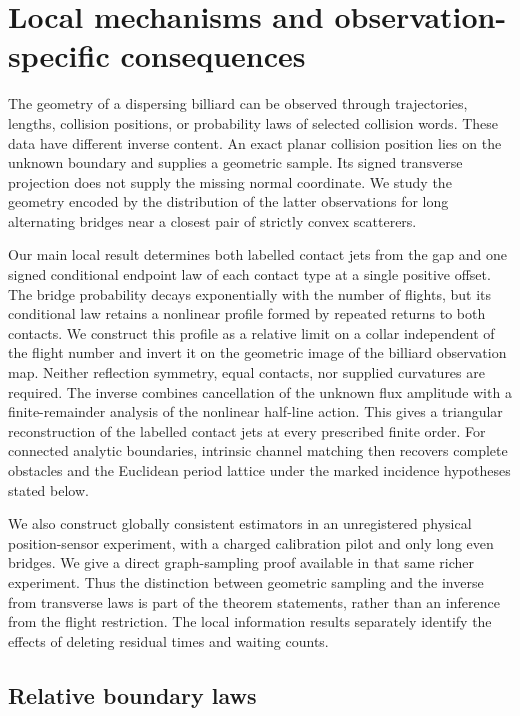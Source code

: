 \section{Local mechanisms and observation-specific consequences}
\label{sec:v27-introduction}
\label{sec:v26-introduction}
\label{sec:v25-introduction}

The geometry of a dispersing billiard can be observed through trajectories,
lengths, collision positions, or probability laws of selected collision
words.  These data have different inverse content.  An exact planar
collision position lies on the unknown boundary and supplies a geometric
sample.  Its signed transverse projection does not supply the missing
normal coordinate.  We study the geometry encoded by the distribution of
the latter observations for long alternating bridges near a closest pair
of strictly convex scatterers.

Our main local result determines both labelled contact jets from the gap
and one signed conditional endpoint law of each contact type at a single
positive offset.  The bridge probability decays exponentially with the
number of flights, but its conditional law retains a nonlinear profile
formed by repeated returns to both contacts.  We construct this profile
as a relative limit on a collar independent of the flight number and
invert it on the geometric image of the billiard observation map.
Neither reflection symmetry, equal contacts, nor supplied curvatures are
required.  The inverse combines cancellation of the unknown flux
amplitude with a finite-remainder analysis of the nonlinear half-line
action.  This gives a triangular reconstruction of the labelled contact
jets at every prescribed finite order.  For connected analytic boundaries,
intrinsic channel matching then recovers complete obstacles and the
Euclidean period lattice under the marked incidence hypotheses stated
below.

We also construct globally consistent estimators in an unregistered
physical position-sensor experiment, with a charged calibration pilot and
only long even bridges.  We give a direct graph-sampling proof available
in that same richer experiment.  Thus the distinction between geometric
sampling and the inverse from transverse laws is part of the theorem
statements, rather than an inference from the flight restriction.  The
local information results separately identify the effects of deleting
residual times and waiting counts.

\subsection{Relative boundary laws}

